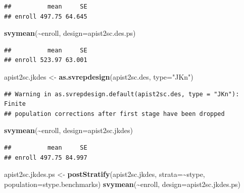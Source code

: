 \documentclass[
]{book}
\newenvironment{Shaded}{\begin{snugshade}}{\end{snugshade}}
\newcommand{\AttributeTok}[1]{\textcolor[rgb]{0.13,0.29,0.53}{#1}}
\newcommand{\FunctionTok}[1]{\textcolor[rgb]{0.13,0.29,0.53}{\textbf{#1}}}
\newcommand{\NormalTok}[1]{#1}
\newcommand{\OtherTok}[1]{\textcolor[rgb]{0.56,0.35,0.01}{#1}}
\newcommand{\SpecialCharTok}[1]{\textcolor[rgb]{0.81,0.36,0.00}{\textbf{#1}}}
\newcommand{\StringTok}[1]{\textcolor[rgb]{0.31,0.60,0.02}{#1}}
\begin{document}
\begin{verbatim}
##          mean     SE
## enroll 497.75 64.645
\end{verbatim}

\begin{Shaded}
\begin{Highlighting}[]
\FunctionTok{svymean}\NormalTok{(}\SpecialCharTok{\textasciitilde{}}\NormalTok{enroll, }\AttributeTok{design=}\NormalTok{apist2sc.des.ps)}
\end{Highlighting}
\end{Shaded}

\begin{verbatim}
##          mean     SE
## enroll 523.97 63.001
\end{verbatim}

\begin{Shaded}
\begin{Highlighting}[]
\NormalTok{apist2sc.jkdes }\OtherTok{\textless{}{-}} \FunctionTok{as.svrepdesign}\NormalTok{(apist2sc.des, }\AttributeTok{type=}\StringTok{"JKn"}\NormalTok{)}
\end{Highlighting}
\end{Shaded}

\begin{verbatim}
## Warning in as.svrepdesign.default(apist2sc.des, type = "JKn"): Finite
## population corrections after first stage have been dropped
\end{verbatim}

\begin{Shaded}
\begin{Highlighting}[]
\FunctionTok{svymean}\NormalTok{(}\SpecialCharTok{\textasciitilde{}}\NormalTok{enroll, }\AttributeTok{design=}\NormalTok{apist2sc.jkdes)}
\end{Highlighting}
\end{Shaded}

\begin{verbatim}
##          mean     SE
## enroll 497.75 84.997
\end{verbatim}

\begin{Shaded}
\begin{Highlighting}[]
\NormalTok{apist2sc.jkdes.ps }\OtherTok{\textless{}{-}} \FunctionTok{postStratify}\NormalTok{(apist2sc.jkdes, }\AttributeTok{strata=}\SpecialCharTok{\textasciitilde{}}\NormalTok{stype, }\AttributeTok{population=}\NormalTok{stype.benchmarks)}
\FunctionTok{svymean}\NormalTok{(}\SpecialCharTok{\textasciitilde{}}\NormalTok{enroll, }\AttributeTok{design=}\NormalTok{apist2sc.jkdes.ps)}
\end{Highlighting}
\end{Shaded}
\end{document}
